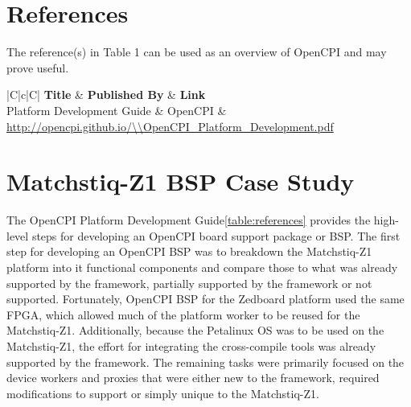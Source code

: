 \newpage
\tableofcontents

\newpage
\section{References}

The reference(s) in Table 1 can be used as an overview of OpenCPI and may prove useful.

\begin{center}
  \begin{table}[H]
  \begin{tabularx}{\textwidth}{|C|c|C|}
    \hline
    \textbf{Title} & \textbf{Published By} & \textbf{Link} \\
    \hline
	Platform Development Guide & OpenCPI & \url{http://opencpi.github.io/\\OpenCPI\_Platform\_Development.pdf}\\
    \hline
  \end{tabularx}
  \caption {References}
  \label{table:references}
  \end{table}
\end{center}

\newpage
\section{Matchstiq-Z1 BSP Case Study}
The OpenCPI Platform Development Guide\ref{table:references} provides the high-level steps for developing an OpenCPI board support package or BSP. The first step for developing an OpenCPI BSP was to breakdown the Matchstiq-Z1 platform into it functional components and compare those to what was already supported by the framework, partially supported by the framework or not supported. Fortunately, OpenCPI BSP for the Zedboard platform used the same FPGA, which allowed much of the platform worker to be reused for the Matchstiq-Z1. Additionally, because the Petalinux OS was to be used on the Matchstiq-Z1, the effort for integrating the cross-compile tools was already supported by the framework. The remaining tasks were primarily focused on the device workers and proxies that were either new to the framework, required modifications to support or simply unique to the Matchstiq-Z1.\\ \par\medskip

